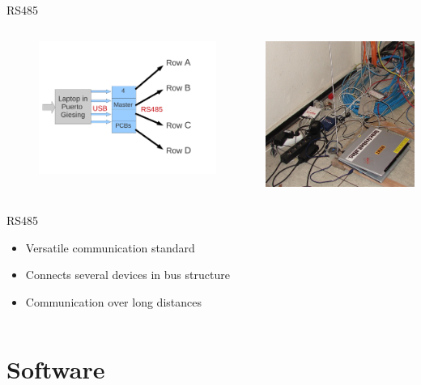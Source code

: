 \documentclass{beamer}
\begin{document}
  \begin{frame}{RS485}
    \begin{columns}
       \begin{column}{6cm}
        \begin{figure}
        \includegraphics[width=6cm, clip, trim= 1cm 3cm 4cm 2.5cm]{bilder/laptop.pdf}
        \end{figure}
      \end{column}
     \begin{column}{5cm}
        \includegraphics[width=5cm, clip, trim= 0cm 0cm 0cm 0cm]{bilder/laptop.jpg}
     \end{column}
   \end{columns}
   \begin{columns}
     \begin{column}{9cm}
       \begin{block}{RS485}
        \begin{itemize}
        \item \small Versatile communication standard
        \item \small Connects several devices in bus structure
        \item \small Communication over long distances
        \end{itemize}
       \end{block}
     \end{column}
   \end{columns}
  \end{frame}

\section{Software}
\end{document}
